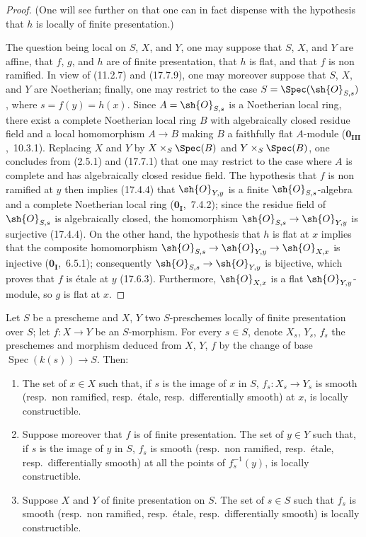 \begin{proof}
(One will see further on  that one can in fact dispense with the hypothesis that $h$ is locally of finite presentation.)

The question being local on $S$, $X$, and $Y$, one may suppose that $S$, $X$, and $Y$ are affine, that $f$, $g$, and $h$ are of finite presentation, that $h$ is flat, and that $f$ is non ramified.
In view of (11.2.7) and (17.7.9), one may moreover suppose that $S$, $X$, and $Y$ are Noetherian; finally, one may restrict to the case $S=\Spec(\sh{O}_{S,s})$, where $s=f(y)=h(x)$.
Since $A=\sh{O}_{S,s}$ is a Noetherian local ring, there exist a complete Noetherian local ring $B$ with algebraically closed residue field and a local homomorphism $A\to B$ making $B$ a faithfully flat $A$-module ($\mathbf{0}_\mathbf{III}$,~10.3.1).
Replacing $X$ and $Y$ by $X\times_S\Spec(B)$ and $Y\times_S\Spec(B)$, one concludes from (2.5.1) and (17.7.1) that one may restrict to the case where $A$ is complete and has algebraically closed residue field.
The hypothesis that $f$ is non ramified at $y$ then implies (17.4.4) that $\sh{O}_{Y,y}$ is a finite $\sh{O}_{S,s}$-algebra and a complete Noetherian local ring ($\mathbf{0}_\mathbf{I}$,~7.4.2); since the residue field of $\sh{O}_{S,s}$ is algebraically closed, the homomorphism $\sh{O}_{S,s}\to\sh{O}_{Y,y}$ is surjective (17.4.4).
On the other hand, the hypothesis that $h$ is flat at $x$ implies that the composite homomorphism $\sh{O}_{S,s}\to\sh{O}_{Y,y}\to\sh{O}_{X,x}$ is injective ($\mathbf{0}_\mathbf{I}$,~6.5.1); consequently $\sh{O}_{S,s}\to\sh{O}_{Y,y}$ is bijective, which proves that $f$ is \'etale at $y$ (17.6.3).
Furthermore, $\sh{O}_{X,x}$ is a flat $\sh{O}_{Y,y}$-module, so $g$ is flat at $x$.
\end{proof}

\begin{proposition}[17.7.11]
\label{IV.17.7.11}
Let $S$ be a prescheme and $X$, $Y$ two $S$-preschemes locally of finite presentation over $S$; let $f:X\to Y$ be an $S$-morphism.
For every $s\in S$, denote $X_s$, $Y_s$, $f_s$ the preschemes and morphism deduced from $X$, $Y$, $f$ by the change of base $\operatorname{Spec}(k(s))\to S$.
Then:
\begin{enumerate}[label=(\roman*)]
  \item The set of $x\in X$ such that, if $s$ is the image of $x$ in $S$, $f_s:X_s\to Y_s$ is smooth (resp.\ non ramified, resp.\ \'etale, resp.\ differentially smooth) at $x$, is locally constructible.
  \item Suppose moreover that $f$ is of finite presentation.
  The set of $y\in Y$ such that, if $s$ is the image of $y$ in $S$, $f_s$ is smooth (resp.\ non ramified, resp.\ \'etale, resp.\ differentially smooth) at all the points of $f_s^{-1}(y)$, is locally constructible.
  \item Suppose $X$ and $Y$ of finite presentation on $S$.
  The set of $s\in S$ such that $f_s$ is smooth (resp.\ non ramified, resp.\ \'etale, resp.\ differentially smooth) is locally constructible.
\end{enumerate}
\end{proposition}


